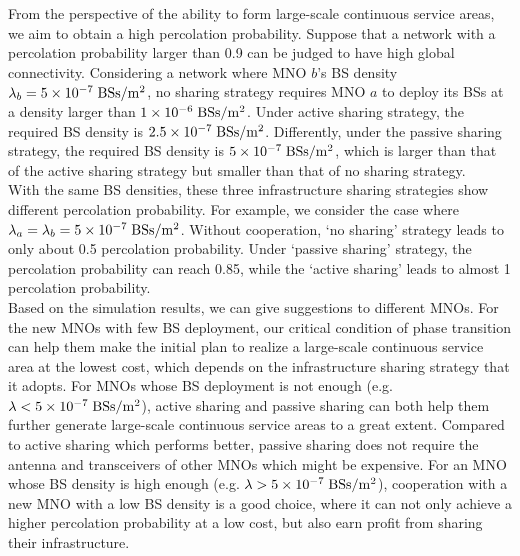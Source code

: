 \documentclass[final]{IEEEtran}
\begin{document}
\indent From the perspective of the ability to form large-scale continuous service areas, we aim to obtain a high percolation probability. Suppose that a network with a percolation probability larger than 0.9 can be judged to have high global connectivity. Considering a network where MNO $b$'s BS density $\lambda_b=5\times10^{-7}\;{\rm BSs/m^2}$, no sharing strategy requires MNO $a$ to deploy its BSs at a density larger than $1\times10^{-6}\;{\rm BSs/m^2}$. Under active sharing strategy, the required BS density is $2.5\times10^{-7}\;{\rm BSs/m^2}$. Differently, under the passive sharing strategy, the required BS density is $5\times10^{-7}\;{\rm BSs/m^2}$, which is larger than that of the active sharing strategy but smaller than that of no sharing strategy. \\
\indent With the same BS densities, these three infrastructure sharing strategies show different percolation probability. For example, we consider the case where $\lambda_{a}=\lambda_{b}=5\times10^{-7}\;{\rm BSs/m^2}$. Without cooperation, `no sharing' strategy leads to only about 0.5 percolation probability. Under `passive sharing' strategy, the percolation probability can reach 0.85, while the `active sharing' leads to almost 1 percolation probability.\\
\indent Based on the simulation results, we can give suggestions to different MNOs. For the new MNOs with few BS deployment, our critical condition of phase transition can help them make the initial plan to realize a large-scale continuous service area at the lowest cost, which depends on the infrastructure sharing strategy that it adopts. For MNOs whose BS deployment is not enough (e.g. $\lambda<5\times10^{-7}\;{\rm BSs/m^2}$), active sharing and passive sharing can both help them further generate large-scale continuous service areas to a great extent. Compared to active sharing which performs better, passive sharing does not require the antenna and transceivers of other MNOs which might be expensive. For an MNO whose BS density is high enough (e.g. $\lambda>5\times10^{-7}\;{\rm BSs/m^2}$), cooperation with a new MNO with a low BS density is a good choice, where it can not only achieve a higher percolation probability at a low cost, but also earn profit from sharing their infrastructure.\\
\end{document}

